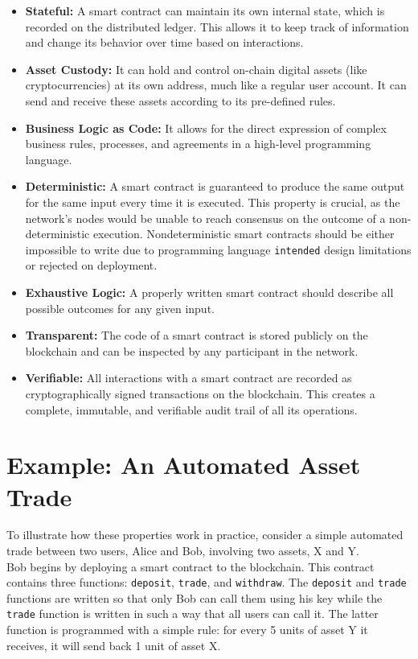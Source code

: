 \documentclass{scrbook}
\begin{document}
\begin{itemize}
    \item \textbf{Stateful:} A smart contract can maintain its own internal state, which is recorded on the distributed ledger. This allows it to keep track of information and change its behavior over time based on interactions.
    \item \textbf{Asset Custody:} It can hold and control on-chain digital assets (like cryptocurrencies) at its own address, much like a regular user account. It can send and receive these assets according to its pre-defined rules.
    \item \textbf{Business Logic as Code:} It allows for the direct expression of complex business rules, processes, and agreements in a high-level programming language.
    \item \textbf{Deterministic:} A smart contract is guaranteed to produce the same output for the same input every time it is executed. This property is crucial, as the network's nodes would be unable to reach consensus on the outcome of a non-deterministic execution. Nondeterministic smart contracts should be either impossible to write due to programming language \texttt{intended} design limitations or rejected on deployment.
    \item \textbf{Exhaustive Logic:} A properly written smart contract should describe all possible outcomes for any given input.
    \item \textbf{Transparent:} The code of a smart contract is stored publicly on the blockchain and can be inspected by any participant in the network.
    \item \textbf{Verifiable:} All interactions with a smart contract are recorded as cryptographically signed transactions on the blockchain. This creates a complete, immutable, and verifiable audit trail of all its operations.
\end{itemize}

\section{Example: An Automated Asset Trade}

To illustrate how these properties work in practice, consider a simple automated trade between two users, Alice and Bob, involving two assets, X and Y.\\

Bob begins by deploying a smart contract to the blockchain. This contract contains three functions: \texttt{deposit}, \texttt{trade}, and \texttt{withdraw}. The \texttt{deposit} and \texttt{trade} functions are written so that only Bob can call them using his key while the \texttt{trade} function is written in such a way that all users can call it. The latter function is programmed with a simple rule: for every 5 units of asset Y it receives, it will send back 1 unit of asset X.\\
\end{document}
